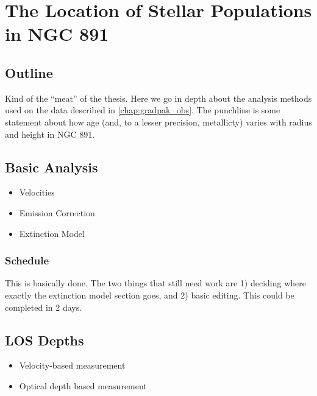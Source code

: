 \chapter[Stellar Populations in NGC 891]{The Location of Stellar Populations in NGC 891}
\label{chap:891_pop}



\section{Outline}
Kind of the ``meat'' of the thesis. Here we go in depth about the analysis
methods used on the data described in \ref{chap:gradpak_obs}. The punchline is
some statement about how age (and, to a lesser precision, metallicty) varies
with radius and height in NGC 891.

\section{Basic Analysis}
\begin{itemize}
  \item Velocities
  \item Emission Correction
  \item Extinction Model
\end{itemize}
\subsection{Schedule}
This is basically done. The two things that still need work are 1) deciding
where exactly the extinction model section goes, and 2) basic editing. This
could be completed in 2 days.

\section{LOS Depths}
\begin{itemize}
  \item Velocity-based measurement
  \item Optical depth based measurement
\end{itemize}
